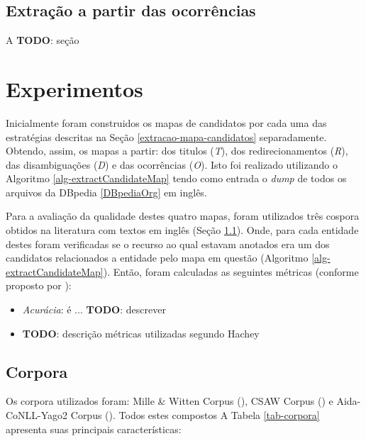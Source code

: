 \documentclass[10pt,a4paper]{llncs}
\newcommand{\todo}[1]{{\color{red}\textsf{\textbf{TODO}}: #1}}
\begin{document}
\subsection{Extração a partir das ocorrências} \label{extracao-ocorrencias}
\indent\indent A
\todo{seção}


\section{Experimentos} \label{experimentos}
\indent\indent Inicialmente foram construidos os mapas de candidatos por cada uma das estratégias descritas na Seção \ref{extracao-mapa-candidatos} separadamente. Obtendo, assim, os mapas a partir: dos titulos (\textit{T}), dos redirecionamentos (\textit{R}), das disambiguações (\textit{D}) e das ocorrências (\textit{O}). Isto foi realizado utilizando o Algoritmo \ref{alg-extractCandidateMap} tendo como entrada o \textit{dump} de todos os arquivos da DBpedia \ref{DBpediaOrg} em inglês.

Para a avaliação da qualidade destes quatro mapas, foram utilizados três cospora obtidos na literatura com textos em inglês (Seção \ref{corpora}). Onde, para cada entidade destes foram verificadas se o recurso ao qual estavam anotados era um dos candidatos relacionados a entidade pelo mapa em questão (Algoritmo \ref{alg-extractCandidateMap}). Então, foram calculadas as seguintes métricas (conforme proposto por \cite{citet-Hachey2012}):

\begin{itemize}
 \item \textit{Acurácia}: é ... \todo{descrever}
 \item \todo{descrição métricas utilizadas segundo Hachey}
\end{itemize}

\subsection{Corpora} \label{corpora}
\indent\indent Os corpora utilizados foram: Mille \& Witten Corpus (\cite{citep-MW-vide-apresentacao-spotters}), CSAW Corpus (\cite{citep-CSAW-vide-apresentacao-spotters}) e Aida-CoNLL-Yago2 Corpus (\cite{citep-MW-vide-apresentacao-spotters}). Todos estes compostos A Tabela \ref{tab-corpora} apresenta suas principais características:
\end{document}
